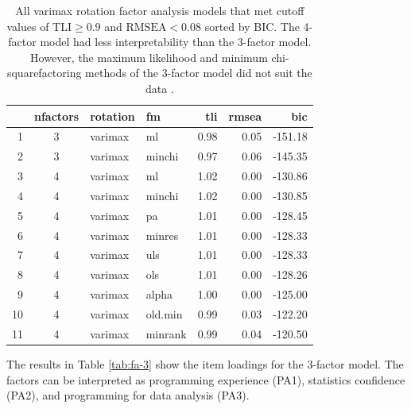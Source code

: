 \documentclass[020-persona\_validation.tex]{subfiles}
\begin{document}
        \begin{table}[ht]
            \centering
            \caption[Factoring methods for all factor methods]
            {
                All varimax rotation factor analysis models that met cutoff values of
                $\text{TLI} \ge 0.9$ and $\text{RMSEA} < 0.08$ sorted by BIC.
                The 4-factor model had less interpretability than the 3-factor model.
                However, the maximum likelihood and minimum chi-squarefactoring methods of the
                3-factor model did not suit the data
                \cite{arifinExploratoryFactorAnalysis2017, brownConfirmatoryFactorAnalysis2015}.
            }
            \begin{tabular}{rcllrrr}
                \hline
               & nfactors & rotation & fm & tli & rmsea & bic \\
                \hline
                1 &   3 & varimax & ml & 0.98 & 0.05 & -151.18 \\
                2 &   3 & varimax & minchi & 0.97 & 0.06 & -145.35 \\
                3 &   4 & varimax & ml & 1.02 & 0.00 & -130.86 \\
                4 &   4 & varimax & minchi & 1.02 & 0.00 & -130.85 \\
                5 &   4 & varimax & pa & 1.01 & 0.00 & -128.45 \\
                6 &   4 & varimax & minres & 1.01 & 0.00 & -128.33 \\
                7 &   4 & varimax & uls & 1.01 & 0.00 & -128.33 \\
                8 &   4 & varimax & ols & 1.01 & 0.00 & -128.26 \\
                9 &   4 & varimax & alpha & 1.00 & 0.00 & -125.00 \\
                10 &   4 & varimax & old.min & 0.99 & 0.03 & -122.20 \\
                11 &   4 & varimax & minrank & 0.99 & 0.04 & -120.50 \\
                 \hline
              \end{tabular}
            \label{tab:all-good-varimax-models} %
        \end{table}

        The results in Table \ref{tab:fa-3} show the item loadings for the 3-factor model.
        The factors can be interpreted as
        programming experience (PA1),
        statistics confidence (PA2), and
        programming for data analysis (PA3).
\end{document}
